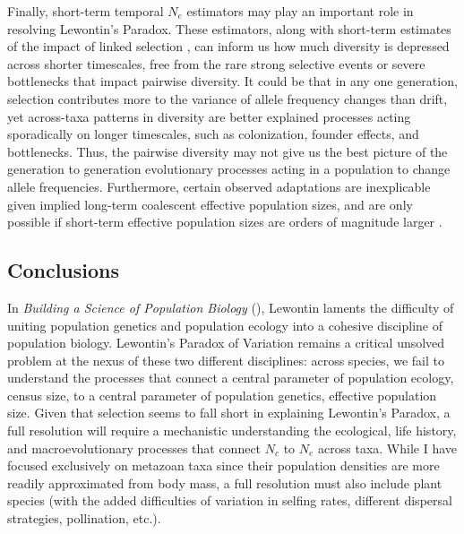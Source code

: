 \documentclass[11pt]{article}
\begin{document}
Finally, short-term temporal $N_e$ estimators may play an important role in
resolving Lewontin's Paradox. These estimators, along with short-term estimates
of the impact of linked selection \parencite{Buffalo2019-qs,Buffalo2020-my},
can inform us how much diversity is depressed across shorter timescales, free
from the rare strong selective events or severe bottlenecks that impact
pairwise diversity. It could be that in any one generation, selection
contributes more to the variance of allele frequency changes than drift, yet
across-taxa patterns in diversity are better explained processes acting
sporadically on longer timescales, such as colonization, founder effects, and
bottlenecks. Thus, the pairwise diversity may not give us the best picture of
the generation to generation evolutionary processes acting in a population to
change allele frequencies. Furthermore, certain observed adaptations are
inexplicable given implied long-term coalescent effective population sizes, and
are only possible if short-term effective population sizes are orders of
magnitude larger \parencite{Karasov2010-fb,Barton2010-pi}.

\subsection*{Conclusions}

In \emph{Building a Science of Population Biology}
(\citeyear{Lewontin2004-fb}), Lewontin laments the difficulty of uniting
population genetics and population ecology into a cohesive discipline of
population biology. Lewontin's Paradox of Variation remains a critical unsolved
problem at the nexus of these two different disciplines: across species, we
fail to understand the processes that connect a central parameter of population
ecology, census size, to a central parameter of population genetics, effective
population size. Given that selection seems to fall short in explaining
Lewontin's Paradox, a full resolution will require a mechanistic understanding
the ecological, life history, and macroevolutionary processes that connect
$N_c$ to $N_e$ across taxa. While I have focused exclusively on metazoan taxa
since their population densities are more readily approximated from body mass,
a full resolution must also include plant species (with the added difficulties
of variation in selfing rates, different dispersal strategies, pollination,
etc.).
\end{document}
